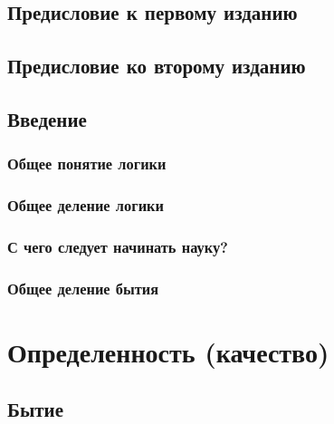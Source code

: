 \documentclass[12pt]{memoir}
\begin{document}
\chapter{Предисловие к первому изданию}



\chapter{Предисловие ко второму изданию}



\chapter{Введение}

\section{Общее понятие логики}



\section{Общее деление логики}




\section{С чего следует начинать науку?}



\section{Общее деление бытия}



\part{Определенность (качество)}



\chapter{Бытие}
\end{document}
